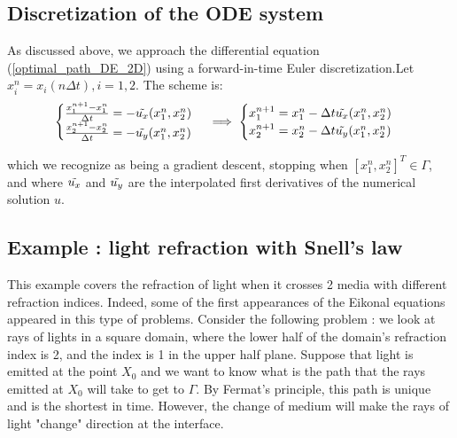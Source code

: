 \documentclass[11pt]{article}
\theoremstyle{definition}
\theoremstyle{remark}
\begin{document}
\subsection{Discretization of the ODE system}
As discussed above, we approach the differential equation (\ref{optimal_path_DE_2D}) using a forward-in-time Euler discretization.Let $x_i^{n}=x_i(n\Delta t), i=1,2$. The scheme is:
\begin{equation}
    \begin{cases}
        \frac{x_1^{n+1}-x_1^n}{\Delta t}=-\Tilde{u_x}(x_1^n,x_2^n) \\
        \frac{x_2^{n+1}-x_2^n}{\Delta t}=-\Tilde{u_y}(x_1^n,x_2^n)
    \end{cases} \implies
    \begin{cases}
        x_1^{n+1} = x_1^n-\Delta t\Tilde{u_x}(x_1^n,x_2^n) \\
        x_2^{n+1} = x_2^n-\Delta t\Tilde{u_y}(x_1^n,x_2^n)
    \end{cases}
\end{equation}

\noindent which we recognize as being a gradient descent, stopping when $[x_1^n,x_2^n]^T\in \Gamma$, and where $\Tilde{u_x}$ and $\Tilde{u_y}$ are the interpolated first derivatives of the numerical solution $u$.

\subsection{Example : light refraction with Snell's law}
\label{section_snells_law}
This example covers the refraction of light when it crosses 2 media with different refraction indices. Indeed, some of the first appearances of the Eikonal equations appeared in this type of problems. Consider the following problem : we look at rays of lights in a square domain, where the lower half of the domain's refraction index is 2, and the index is 1 in the upper half plane. Suppose that light is emitted at the point $X_0$ and we want to know what is the path that the rays emitted at $X_0$ will take to get to $\Gamma$. By Fermat's principle, this path is unique and is the shortest in time. However, the change of medium will make the rays of light "change" direction at the interface. \\
\end{document}

